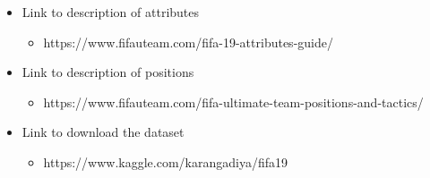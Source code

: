 \documentclass[11pt]{article}
\providecommand{\tightlist}{%
      \setlength{\itemsep}{0pt}\setlength{\parskip}{0pt}}
\begin{document}
    \begin{itemize}
\tightlist
\item
  Link to description of attributes

  \begin{itemize}
  \tightlist
  \item
    https://www.fifauteam.com/fifa-19-attributes-guide/
  \end{itemize}
\item
  Link to description of positions

  \begin{itemize}
  \tightlist
  \item
    https://www.fifauteam.com/fifa-ultimate-team-positions-and-tactics/
  \end{itemize}
\item
  Link to download the dataset

  \begin{itemize}
  \tightlist
  \item
    https://www.kaggle.com/karangadiya/fifa19
  \end{itemize}
\end{itemize}


    
    
    
    
\end{document}
